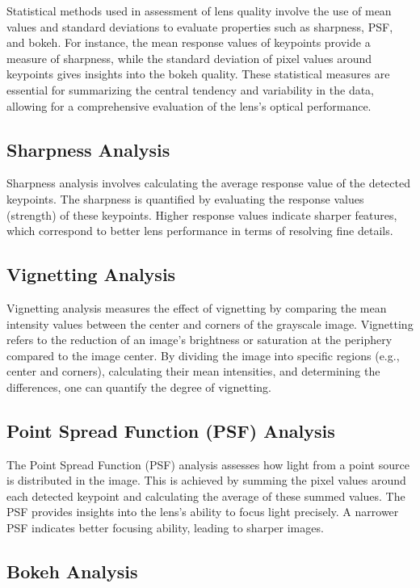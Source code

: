 Statistical methods used in assessment of lens quality involve the use of mean values and standard deviations to evaluate properties such as sharpness, PSF, and bokeh. For instance, the mean response values of keypoints provide a measure of sharpness, while the standard deviation of pixel values around keypoints gives insights into the bokeh quality. These statistical measures are essential for summarizing the central tendency and variability in the data, allowing for a comprehensive evaluation of the lens's optical performance.

\subsection{Sharpness Analysis}

Sharpness analysis involves calculating the average response value of the detected keypoints. The sharpness is quantified by evaluating the response values (strength) of these keypoints. Higher response values indicate sharper features, which correspond to better lens performance in terms of resolving fine details.

\subsection{Vignetting Analysis}

Vignetting analysis measures the effect of vignetting by comparing the mean intensity values between the center and corners of the grayscale image. Vignetting refers to the reduction of an image's brightness or saturation at the periphery compared to the image center. By dividing the image into specific regions (e.g., center and corners), calculating their mean intensities, and determining the differences, one can quantify the degree of vignetting.

\subsection{Point Spread Function (PSF) Analysis}

The Point Spread Function (PSF) analysis assesses how light from a point source is distributed in the image. This is achieved by summing the pixel values around each detected keypoint and calculating the average of these summed values. The PSF provides insights into the lens's ability to focus light precisely. A narrower PSF indicates better focusing ability, leading to sharper images.

\subsection{Bokeh Analysis}

